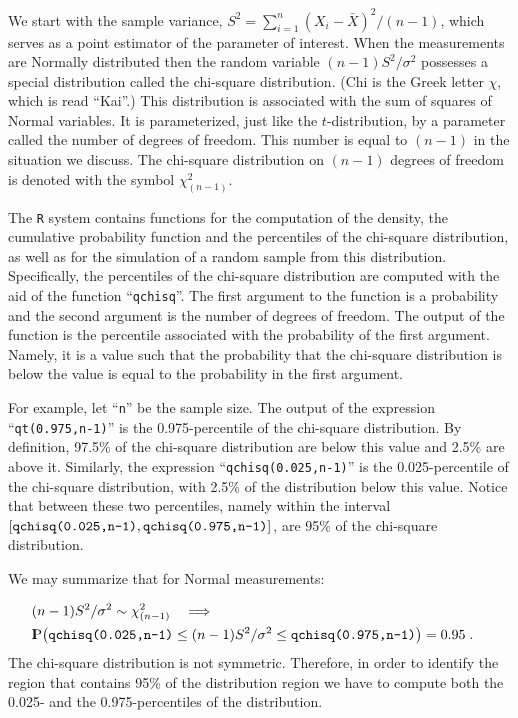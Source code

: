 \documentclass[]{krantz}
\newcommand{\Prob}{{\rm I\kern-.3em P}}
\theoremstyle{definition}
\theoremstyle{definition}
\theoremstyle{definition}
\theoremstyle{remark}
\begin{document}
We start with the sample variance,
\(S^2 = \sum_{i=1}^n (X_i - \bar X)^2/(n-1)\), which serves as a point
estimator of the parameter of interest. When the measurements are
Normally distributed then the random variable \((n-1)S^2/\sigma^2\)
possesses a special distribution called the chi-square distribution.
(Chi is the Greek letter \(\chi\), which is read ``Kai''.) This distribution
is associated with the sum of squares of Normal variables. It is
parameterized, just like the \(t\)-distribution, by a parameter called the
number of degrees of freedom. This number is equal to \((n-1)\) in the
situation we discuss. The chi-square distribution on \((n-1)\) degrees of
freedom is denoted with the symbol \(\chi^2_{(n-1)}\).

The \texttt{R} system contains functions for the computation of the density,
the cumulative probability function and the percentiles of the
chi-square distribution, as well as for the simulation of a random
sample from this distribution. Specifically, the percentiles of the
chi-square distribution are computed with the aid of the function
``\texttt{qchisq}''. The first argument to the function is a probability and the
second argument is the number of degrees of freedom. The output of the
function is the percentile associated with the probability of the first
argument. Namely, it is a value such that the probability that the
chi-square distribution is below the value is equal to the probability
in the first argument.

For example, let ``\texttt{n}'' be the sample size. The output of the expression
``\texttt{qt(0.975,n-1)}'' is the 0.975-percentile of the chi-square
distribution. By definition, 97.5\% of the chi-square distribution are
below this value and 2.5\% are above it. Similarly, the expression
``\texttt{qchisq(0.025,n-1)}'' is the 0.025-percentile of the chi-square
distribution, with 2.5\% of the distribution below this value. Notice
that between these two percentiles, namely within the interval
\([\mbox{\texttt{qchisq(0.025,n-1)}}, \mbox{\texttt{qchisq(0.975,n-1)}}]\),
are 95\% of the chi-square distribution.

We may summarize that for Normal measurements:

\[\begin{aligned}
\lefteqn{(n-1)S^2/\sigma^2 \sim \chi^2_{(n-1)} \quad \Longrightarrow }\\ & \Prob \big( \mbox{\texttt{qchisq(0.025,n-1)}} \leq (n-1)S^2/\sigma^2  \leq \mbox{\texttt{qchisq(0.975,n-1)}} \big) = 0.95\;.\end{aligned}\]
The chi-square distribution is not symmetric. Therefore, in order to
identify the region that contains 95\% of the distribution region we have
to compute both the 0.025- and the 0.975-percentiles of the
distribution.
\end{document}
